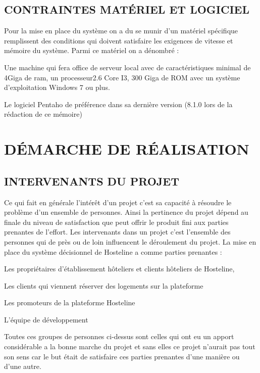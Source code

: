  \subsection{CONTRAINTES MATÉRIEL ET LOGICIEL}
 
 Pour la mise en place du système on a du se munir d’un matériel spécifique remplissent des conditions qui doivent satisfaire les exigences de vitesse et mémoire du système. Parmi ce matériel on a dénombré : 
 \begin{list}{•}{ }
   \item Une machine qui fera office de serveur local avec de caractéristiques minimal de 4Giga de ram, un processeur2.6 Core I3, 300 Giga de ROM avec un système d’exploitation Windows 7 ou plus.
   \item Le logiciel Pentaho de préférence dans sa dernière version (8.1.0 lors de la rédaction de ce mémoire)\\
 \end{list}

   
 \section{DÉMARCHE DE RÉALISATION}
 \subsection{INTERVENANTS DU PROJET}
 Ce qui fait en générale l’intérêt d’un projet c’est sa capacité à résoudre le problème d’un ensemble de personnes. Ainsi la pertinence du projet dépend au finale du niveau de satisfaction que peut offrir le produit fini aux parties prenantes de l’effort. Les intervenants dans un projet c’est l’ensemble des personnes qui de près ou de loin influencent le déroulement du projet. La mise en place du système décisionnel de Hosteline a comme parties prenantes :
 \begin{list}{•}{ }
   \item Les propriétaires d’établissement hôteliers et clients hôteliers de Hosteline,
   \item Les clients qui viennent réserver des logements sur la plateforme
   \item Les promoteurs de la plateforme Hosteline
   \item L’équipe de développement\\
 \end{list}

Toutes ces groupes de personnes ci-dessus sont celles qui ont eu un apport considérable a la bonne marche du projet et sans elles ce projet n’aurait pas tout son sens car le but était de satisfaire ces parties prenantes d’une manière ou d’une autre.

